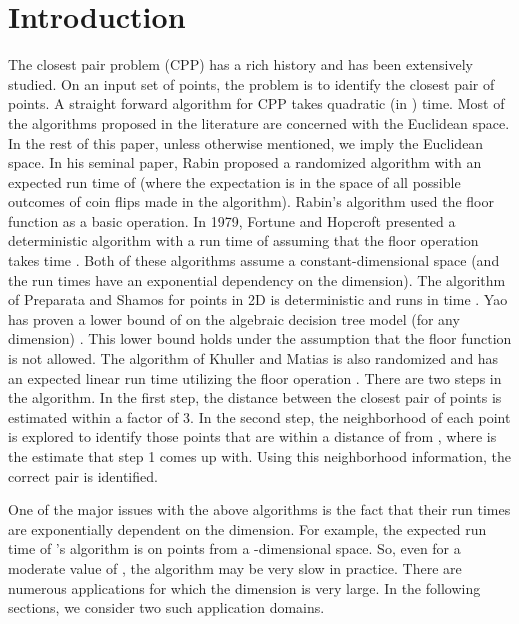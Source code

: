 \documentclass{article}
\theoremstyle{definition}
\theoremstyle{remark}
\begin{document}
\section{Introduction}
\label{intro}
The closest pair problem (CPP) has a rich history and has been extensively studied. On an input set of  points, the problem is to identify the closest pair of points. A straight forward algorithm for CPP takes quadratic (in ) time. Most of the algorithms proposed in the literature are concerned with the Euclidean space. In the rest of this paper, unless otherwise mentioned, we imply the Euclidean space. In his seminal paper, Rabin proposed a randomized algorithm with an expected run time of  \cite{RAB76} (where the expectation is in the space of all possible outcomes of coin flips made in the algorithm). Rabin's algorithm used the floor function as a basic operation. In 1979, Fortune and Hopcroft presented a deterministic algorithm with a run time of  assuming that the floor operation takes  time  \cite{FH79}. Both of these algorithms assume a constant-dimensional space (and the run times have an exponential dependency on the dimension). The algorithm of Preparata and Shamos for points in 2D is deterministic and runs in  time \cite{PS86}. Yao has proven a lower bound of  on the algebraic decision tree model (for any dimension) \cite{YO91}. This lower bound holds under the assumption that the floor function is not allowed.
The algorithm of Khuller and Matias is also randomized and has an expected linear run time utilizing the floor operation \cite{SY95}. There are two steps in the algorithm. In the first step, the distance between the closest pair of points is estimated within a factor of 3. In the second step, the neighborhood of each point  is explored to identify those points that are within a distance of  from , where  is the estimate that step 1 comes up with. Using this neighborhood information, the correct pair is identified.



One of the major issues with the above algorithms is the fact that their run times are exponentially dependent on the dimension.   For example, the expected run time of \cite{SY95}'s algorithm is  on  points from a -dimensional space. So, even for a moderate value of , the algorithm may be very slow in practice. There are numerous applications for which the dimension is very large. In the following sections, we consider two such application domains.
\end{document}
